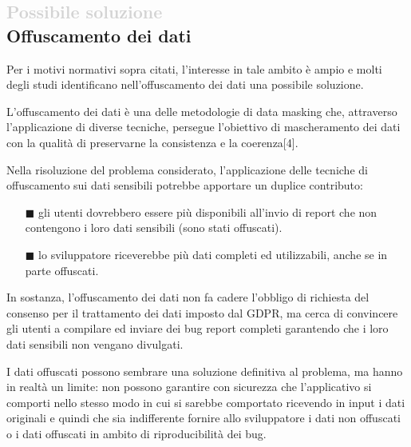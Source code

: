
\subsection*{\textcolor{lightgray}{\normalsize{Possibile soluzione}} \\ Offuscamento dei dati}
Per i motivi normativi sopra citati, l'interesse in tale ambito è ampio e molti degli studi identificano nell'offuscamento dei dati una possibile soluzione. 

L'offuscamento dei dati è una delle metodologie di data masking che, attraverso l'applicazione di diverse tecniche, persegue l'obiettivo di mascheramento dei dati con la qualità di preservarne la consistenza e la coerenza[4]. 

Nella risoluzione del problema considerato, l'applicazione delle tecniche di offuscamento sui dati sensibili potrebbe apportare un duplice contributo: 
\begin{enumerate} [nosep]
  \item[$\blacksquare$] gli utenti dovrebbero essere più disponibili all'invio di report che non contengono i loro dati sensibili (sono stati offuscati).
   \item[$\blacksquare$]  lo sviluppatore riceverebbe più dati completi ed utilizzabili, anche se in parte offuscati.
\end{enumerate}In sostanza, l'offuscamento dei dati non fa cadere l'obbligo di richiesta del consenso per il trattamento dei dati imposto dal GDPR, ma cerca di convincere gli utenti a compilare ed inviare dei bug report completi garantendo che i loro dati sensibili non vengano divulgati.

I dati offuscati possono sembrare una soluzione definitiva al problema, ma hanno in realtà un limite: non possono garantire con sicurezza che l'applicativo si comporti nello stesso modo in cui si sarebbe comportato ricevendo in input i dati originali e quindi che sia indifferente fornire allo sviluppatore i dati non offuscati o i dati offuscati in ambito di riproducibilità dei bug. 


